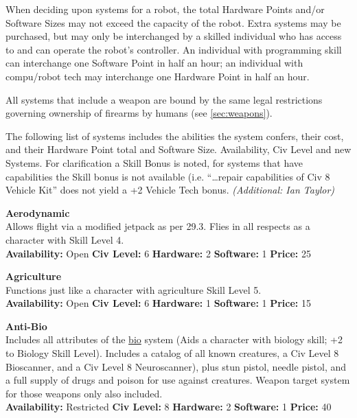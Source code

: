 When deciding upon systems for a robot, the total Hardware Points
and/or Software Sizes may not exceed the capacity of the robot.  Extra
systems may be purchased, but may only be interchanged by a skilled
individual who has access to and can operate the robot's controller.
An individual with programming skill can interchange one Software
Point in half an hour; an individual with compu/robot tech may
interchange one Hardware Point in half an hour.

All systems that include a weapon are bound by the same legal
restrictions governing ownership of firearms by humans (see \ref{sec:weapons}).

The following list of systems includes the abilities the system
confers, their cost, and their Hardware Point total and Software Size.
Availability, Civ Level and new Systems. For clarification a Skill
Bonus is noted, for systems that have capabilities the Skill bonus is
not available (i.e. ``\ldots repair capabilities of Civ 8 Vehicle
Kit'' does not yield a +2 Vehicle Tech bonus. \emph{(Additional: Ian
  Taylor)}

\newcommand{\botsys}[2]{%
\bigskip%
%
\noindent\textbf{\hypertarget{tag:bot-#1}{#2}}}

\label{sec:robot-systems-change-1}
\botsys{aerodynamic}{Aerodynamic}\\
Allows flight via a modified jetpack as per 29.3. Flies in all
respects as a character with Skill Level 4.\\
\textbf{Availability:} Open \textbf{Civ Level:} 6 \textbf{Hardware:} 2 \textbf{Software:} 1
\textbf{Price:} 25

\botsys{agriculture}{Agriculture} \\
Functions just like a character with agriculture Skill Level 5. \\
\textbf{Availability:} Open \textbf{Civ Level:} 6 \textbf{Hardware:} 1
\textbf{Software:} 1 \textbf{Price:} 15 


\botsys{anti-bio}{Anti-Bio}\\
Includes all attributes of the \hyperlink{tag:bio}{bio} system (Aids a character with
biology skill; +2 to Biology Skill Level). Includes a catalog of all
known creatures, a Civ Level 8 Bioscanner, and a Civ Level 8
Neuroscanner), plus stun pistol, needle pistol, and a full supply of
drugs and poison for use against creatures. Weapon target system for
those weapons only also included.\\
\textbf{Availability:} Restricted
\textbf{Civ Level:} 8 \textbf{Hardware:} 2 \textbf{Software:} 1
\textbf{Price:} 40

